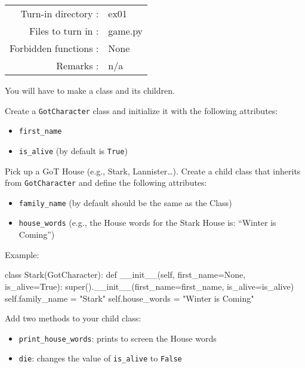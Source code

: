 \documentclass[]{article}
\newenvironment{Shaded}{\begin{snugshade}}{\end{snugshade}}
\newcommand{\BuiltInTok}[1]{\textcolor[rgb]{0.50,0.55,0.55}{#1}}
\newcommand{\FunctionTok}[1]{\textcolor[rgb]{0.56,0.27,0.68}{#1}}
\newcommand{\KeywordTok}[1]{\textcolor[rgb]{0.81,0.81,0.76}{#1}}
\newcommand{\NormalTok}[1]{\textcolor[rgb]{0.81,0.81,0.76}{#1}}
\newcommand{\OperatorTok}[1]{\textcolor[rgb]{0.81,0.81,0.76}{#1}}
\newcommand{\StringTok}[1]{\textcolor[rgb]{0.96,0.31,0.31}{#1}}
\newcommand{\VariableTok}[1]{\textcolor[rgb]{0.15,0.68,0.68}{#1}}
\begin{document}
\begin{longtable}[]{@{}rl@{}}
\toprule
\endhead
Turn-in directory : & ex01\tabularnewline
Files to turn in : & game.py\tabularnewline
Forbidden functions : & None\tabularnewline
Remarks : & n/a\tabularnewline
\bottomrule
\end{longtable}

You will have to make a class and its children.

Create a \texttt{GotCharacter} class and initialize it with the
following attributes:

\begin{itemize}
\item
  \texttt{first\_name}
\item
  \texttt{is\_alive} (by default is \texttt{True})
\end{itemize}

Pick up a GoT House (e.g., Stark, Lannister\ldots{}). Create a child
class that inherits from \texttt{GotCharacter} and define the following
attributes:

\begin{itemize}
\item
  \texttt{family\_name} (by default should be the same as the Class)
\item
  \texttt{house\_words} (e.g., the House words for the Stark House is:
  ``Winter is Coming'')
\end{itemize}

Example:

\begin{Shaded}
\begin{Highlighting}[]
\KeywordTok{class}\NormalTok{ Stark(GotCharacter):}
    \KeywordTok{def} \FunctionTok{__init__}\NormalTok{(}\VariableTok{self}\NormalTok{, first_name}\OperatorTok{=}\VariableTok{None}\NormalTok{, is_alive}\OperatorTok{=}\VariableTok{True}\NormalTok{):}
        \BuiltInTok{super}\NormalTok{().}\FunctionTok{__init__}\NormalTok{(first_name}\OperatorTok{=}\NormalTok{first_name, is_alive}\OperatorTok{=}\NormalTok{is_alive)}
        \VariableTok{self}\NormalTok{.family_name }\OperatorTok{=} \StringTok{"Stark"}
        \VariableTok{self}\NormalTok{.house_words }\OperatorTok{=} \StringTok{"Winter is Coming"}
\end{Highlighting}
\end{Shaded}

Add two methods to your child class:

\begin{itemize}
\item
  \texttt{print\_house\_words}: prints to screen the House words
\item
  \texttt{die}: changes the value of \texttt{is\_alive} to
  \texttt{False}
\end{itemize}
\end{document}
